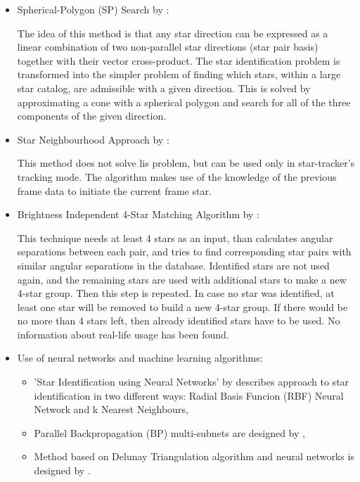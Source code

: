 \documentclass[12pt,a4paper,twoside]{article}
\begin{document}
\begin{itemize}
\item Spherical-Polygon (SP) Search by \citet{mortari1999sp}:

The idea of this method is that any star direction can be expressed as a linear combination of two non-parallel star directions (star pair basis) together with their vector cross-product. The star identification problem is transformed into the simpler problem of finding which stars, within a large star catalog, are admissible with a given direction. This is solved by approximating a cone with a spherical polygon and search for all of the three components of the given direction. 

\item Star Neighbourhood Approach by \citet{samaan2005recursive}:

This method does not solve \gls{lis} problem, but can be used only in star-tracker's tracking mode. The algorithm makes use of the knowledge of the previous frame data to initiate the current frame star.


\item Brightness Independent 4-Star Matching Algorithm by \citet{dong2006brightness}:

This technique needs at least 4 stars as an input, than calculates angular separations between each pair, and tries to find corresponding star pairs with similar angular separations in the database.
Identified stars are not used again, and the remaining stars are used with additional stars to make a new 4-star group. Then this step is repeated. In case no star was identified, at least one star will be removed to build a new 4-star group. If there would be no more than 4 stars left, then already identified stars have to be used.
No information about real-life usage has been found.

\item Use of neural networks and machine learning algorithms:

\begin{itemize}
\item 'Star Identification using Neural Networks' by \citet{lindbladstar} describes approach to star identification in two different ways: Radial Basis Funcion (RBF) Neural Network and k Nearest Neighbours,

\item Parallel Backpropagation (BP) multi-subnets are designed by \citet{li2003star},

\item Method based on Delunay Triangulation algorithm and neural networks is designed by \citet{miri2012star}.

\end{itemize}
\end{itemize}
\end{document}
